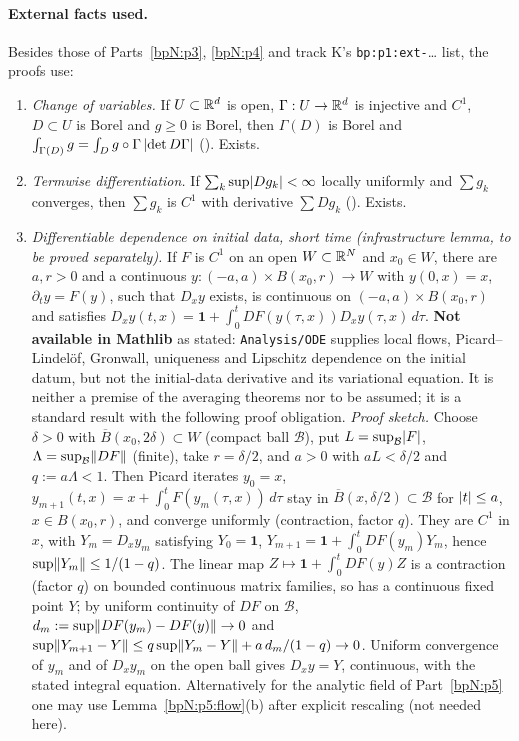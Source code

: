 \paragraph{External facts used.} Besides those of Parts~\ref{bpN:p3}, \ref{bpN:p4} and track K's \texttt{bp:p1:ext-}\dots{} list, the proofs use:
\begin{enumerate}[label=(X\arabic*),leftmargin=2.2em]
\item\label{bpN:p12:ext-cov} \emph{Change of variables.} If $U\subset\mathbb{R}^d$ is open, $\Gamma:U\to\mathbb{R}^d$ is injective and $C^1$, $D\subset U$ is Borel and $g\ge0$ is Borel, then $\Gamma(D)$ is Borel and $\int_{\Gamma(D)}g=\int_D g\circ\Gamma\,\lvert \det D\Gamma\rvert$ (). Exists.
\item\label{bpN:p12:ext-tsum} \emph{Termwise differentiation.} If $\sum_k\sup\lvert D g_k\rvert<\infty$ locally uniformly and $\sum g_k$ converges, then $\sum g_k$ is $C^1$ with derivative $\sum Dg_k$ (). Exists.
\item\label{bpN:p12:ext-dep} \emph{Differentiable dependence on initial data, short time (infrastructure lemma, to be proved separately).} If $F$ is $C^1$ on an open $W\subset\mathbb{R}^N$ and $x_0\in W$, there are $a,r>0$ and a continuous $y:(-a,a)\times B(x_0,r)\to W$ with $y(0,x)=x$, $\partial_ty=F(y)$, such that $D_xy$ exists, is continuous on $(-a,a)\times B(x_0,r)$ and satisfies $D_xy(t,x)=\mathbf 1+\int_0^tDF(y(\tau,x))D_xy(\tau,x)\,d\tau$. \textbf{Not available in Mathlib} as stated: \texttt{Analysis/ODE} supplies local flows, Picard--Lindel\"of, Gronwall, uniqueness and Lipschitz dependence on the initial datum, but not the initial-data derivative and its variational equation. It is neither a premise of the averaging theorems nor to be assumed; it is a standard result with the following proof obligation. \emph{Proof sketch.} Choose $\delta>0$ with $\overline B(x_0,2\delta)\subset W$ (compact ball $\mathcal B$), put $L=\sup_{\mathcal B}\lvert F\rvert$, $\Lambda=\sup_{\mathcal B}\lVert DF\rVert$ (finite), take $r=\delta/2$, and $a>0$ with $aL<\delta/2$ and $q:=a\Lambda<1$. Then Picard iterates $y_0=x$, $y_{m+1}(t,x)=x+\int_0^tF(y_m(\tau,x))\,d\tau$ stay in $\overline B(x,\delta/2)\subset\mathcal B$ for $\lvert t\rvert\le a$, $x\in B(x_0,r)$, and converge uniformly (contraction, factor $q$). They are $C^1$ in $x$, with $Y_m=D_xy_m$ satisfying $Y_0=\mathbf 1$, $Y_{m+1}=\mathbf 1+\int_0^tDF(y_m)Y_m$, hence $\sup\lVert Y_m\rVert\le1/(1-q)$. The linear map $Z\mapsto\mathbf 1+\int_0^tDF(y)Z$ is a contraction (factor $q$) on bounded continuous matrix families, so has a continuous fixed point $Y$; by uniform continuity of $DF$ on $\mathcal B$, $d_m:=\sup\lVert DF(y_m)-DF(y)\rVert\to0$ and $\sup\lVert Y_{m+1}-Y\rVert\le q\sup\lVert Y_m-Y\rVert+a\,d_m/(1-q)\to0$. Uniform convergence of $y_m$ and of $D_xy_m$ on the open ball gives $D_xy=Y$, continuous, with the stated integral equation. Alternatively for the analytic field of Part~\ref{bpN:p5} one may use Lemma~\ref{bpN:p5:flow}(b) after explicit rescaling (not needed here).

\end{enumerate}
